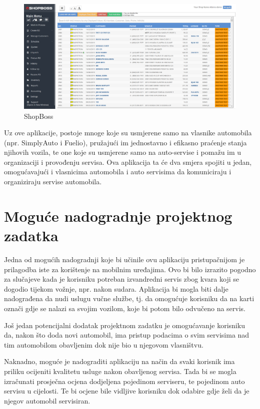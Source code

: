 		\begin{figure}[H]
			\includegraphics[scale=0.3]{slike/shopboss.PNG}
			\centering
			\caption{ShopBoss}
			\label{fig:shopboss}
		\end{figure}
		
		Uz ove aplikacije, postoje mnoge koje su usmjerene samo na vlasnike automobila (npr. SimplyAuto i Fuelio), pružajući im jednostavno i efikasno praćenje stanja njihovih vozila, te one koje su usmjerene samo na auto-servise i pomažu im u organizaciji i provođenju servisa. Ova aplikacija ta će dva smjera spojiti u jedan, omogućavajući i vlasnicima automobila i auto servisima da komuniciraju i organiziraju servise automobila. \\
		
		\section{Moguće nadogradnje projektnog zadatka}
		
		\normalsize Jedna od mogućih nadogradnji koje bi učinile ovu aplikaciju pristupačnijom je prilagodba iste za korištenje na mobilnim uređajima. Ovo bi bilo izrazito pogodno za slučajeve kada je korisniku potreban izvandredni servis zbog kvara koji se dogodio tijekom vožnje, npr. nakon sudara. Aplikacija bi mogla biti dalje nadograđena da nudi uslugu vučne službe, tj. da omogućuje korisniku da na karti označi gdje se nalazi sa svojim vozilom, koje bi potom bilo odvučeno na servis.
		
		Još jedan potencijalni dodatak projektnom zadatku je omogućavanje korisniku da, nakon što doda novi automobil, ima pristup podacima o svim servisima nad tim automobilom obavljenim dok nije bio u njegovom vlasništvu.
		
		Naknadno, moguće je nadograditi aplikaciju na način da svaki korisnik ima priliku ocijeniti kvalitetu usluge nakon obavljenog servisa. Tada bi se mogla izračunati prosječna ocjena dodjeljena pojedinom serviseru, te pojedinom auto servisu u cijelosti. Te bi ocjene bile vidljive korisniku dok odabire gdje želi da je njegov automobil servisiran.
		
